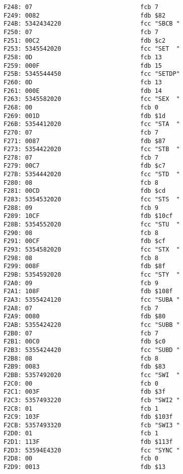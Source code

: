 {\begin{verbatim}
F248: 07                              fcb 7
F249: 0082                            fdb $82
F24B: 5342434220                      fcc "SBCB "
F250: 07                              fcb 7
F251: 00C2                            fdb $c2
F253: 5345542020                      fcc "SET  "
F258: 0D                              fcb 13
F259: 000F                            fdb 15
F25B: 5345544450                      fcc "SETDP"
F260: 0D                              fcb 13
F261: 000E                            fdb 14
F263: 5345582020                      fcc "SEX  "
F268: 00                              fcb 0
F269: 001D                            fdb $1d
F26B: 5354412020                      fcc "STA  "
F270: 07                              fcb 7
F271: 0087                            fdb $87
F273: 5354422020                      fcc "STB  "
F278: 07                              fcb 7
F279: 00C7                            fdb $c7
F27B: 5354442020                      fcc "STD  "
F280: 08                              fcb 8
F281: 00CD                            fdb $cd
F283: 5354532020                      fcc "STS  "
F288: 09                              fcb 9
F289: 10CF                            fdb $10cf
F28B: 5354552020                      fcc "STU  "
F290: 08                              fcb 8
F291: 00CF                            fdb $cf
F293: 5354582020                      fcc "STX  "
F298: 08                              fcb 8
F299: 008F                            fdb $8f
F29B: 5354592020                      fcc "STY  "
F2A0: 09                              fcb 9
F2A1: 108F                            fdb $108f
F2A3: 5355424120                      fcc "SUBA "
F2A8: 07                              fcb 7
F2A9: 0080                            fdb $80
F2AB: 5355424220                      fcc "SUBB "
F2B0: 07                              fcb 7
F2B1: 00C0                            fdb $c0 
F2B3: 5355424420                      fcc "SUBD "
F2B8: 08                              fcb 8
F2B9: 0083                            fdb $83
F2BB: 5357492020                      fcc "SWI  "
F2C0: 00                              fcb 0
F2C1: 003F                            fdb $3f
F2C3: 5357493220                      fcb "SWI2 "
F2C8: 01                              fcb 1
F2C9: 103F                            fdb $103f
F2CB: 5357493320                      fcb "SWI3 "
F2D0: 01                              fcb 1
F2D1: 113F                            fdb $113f
F2D3: 53594E4320                      fcc "SYNC "
F2D8: 00                              fcb 0
F2D9: 0013                            fdb $13

\end{verbatim}}
